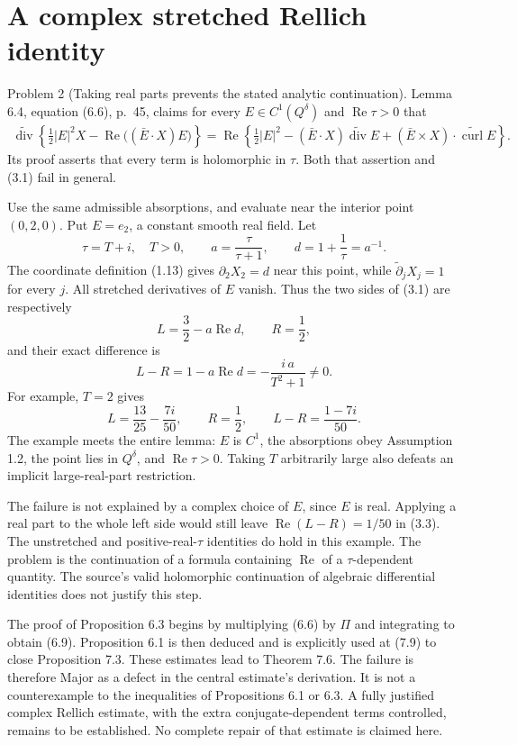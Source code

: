 \documentclass[10pt]{article}
\begin{document}
\section*{A complex stretched Rellich identity}
Problem 2 (Taking real parts prevents the stated analytic continuation).  Lemma 6.4, equation (6.6), p. 45, claims for every \(E\in C^1(Q^\delta)\) and \(\operatorname{Re}\tau>0\) that \[\begin{aligned}
 \widetilde{\operatorname{div}}\left\{\tfrac12|E|^2X-\operatorname{Re}\bigl((\bar E\cdot X)E\bigr)\right\}
 =\operatorname{Re}\left\{\tfrac12|E|^2-(\bar E\cdot X)\widetilde{\operatorname{div}}E
                  +(\bar E\times X)\cdot\widetilde{\operatorname{curl}}E\right\}.
 \end{aligned}\tag{3.1}\] Its proof asserts that every term is holomorphic in \(\tau\). Both that assertion and (3.1) fail in general.\par
Use the same admissible absorptions, and evaluate near the interior point \((0,2,0)\). Put \(E=e_2\), a constant smooth real field. Let \[\tau=T+i,\quad T>0,\qquad a=\frac{\tau}{\tau+1},\qquad
 d=1+\frac1{\tau}=a^{-1}.\] The coordinate definition (1.13) gives \(\partial_2X_2=d\) near this point, while \(\widetilde\partial_jX_j=1\) for every \(j\). All stretched derivatives of \(E\) vanish. Thus the two sides of (3.1) are respectively \[L=\frac32-a\operatorname{Re}d,\qquad R=\frac12,\] and their exact difference is \[L-R=1-a\operatorname{Re}d=-\frac{i\,a}{T^2+1}\ne0 .
 \tag{3.2}\] For example, \(T=2\) gives \[L=\frac{13}{25}-\frac{7i}{50},\qquad
 R=\frac12,\qquad L-R=\frac{1-7i}{50}.
 \tag{3.3}\] The example meets the entire lemma: \(E\) is \(C^1\), the absorptions obey Assumption 1.2, the point lies in \(Q^\delta\), and \(\operatorname{Re}\tau>0\). Taking \(T\) arbitrarily large also defeats an implicit large-real-part restriction.\par
The failure is not explained by a complex choice of \(E\), since \(E\) is real. Applying a real part to the whole left side would still leave \(\operatorname{Re}(L-R)=1/50\) in (3.3). The unstretched and positive-real-\(\tau\) identities do hold in this example. The problem is the continuation of a formula containing \(\operatorname{Re}\) of a \(\tau\)-dependent quantity. The source’s valid holomorphic continuation of algebraic differential identities does not justify this step.\par
The proof of Proposition 6.3 begins by multiplying (6.6) by \(\Pi\) and integrating to obtain (6.9). Proposition 6.1 is then deduced and is explicitly used at (7.9) to close Proposition 7.3. These estimates lead to Theorem 7.6. The failure is therefore Major as a defect in the central estimate’s derivation. It is not a counterexample to the inequalities of Propositions 6.1 or 6.3. A fully justified complex Rellich estimate, with the extra conjugate-dependent terms controlled, remains to be established. No complete repair of that estimate is claimed here.\par
\end{document}
